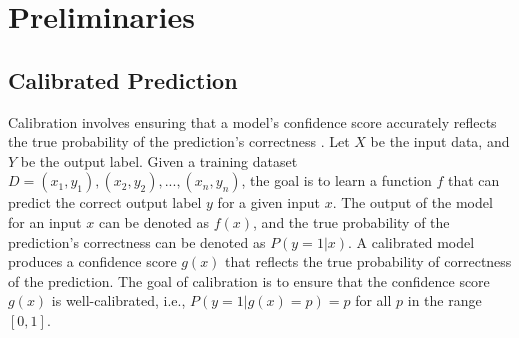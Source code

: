 \section*{Preliminaries}
\label{Sec:Prelem}

\subsection*{Calibrated Prediction}
\label{sec:Calibration}
Calibration involves ensuring that a model's confidence score accurately reflects the true probability of the prediction's correctness \cite{ovadia2019can}. Let $X$ be the input data, and $Y$ be the output label. Given a training dataset $D = {(x_1, y_1), (x_2, y_2),..., (x_n, y_n)}$, the goal is to learn a function $f$ that can predict the correct output label $y$ for a given input $x$. The output of the model for an input $x$ can be denoted as $f(x)$, and the true probability of the prediction's correctness can be denoted as $P(y=1|x)$. A calibrated model produces a confidence score $g(x)$ that reflects the true probability of correctness of the prediction. The goal of calibration is to ensure that the confidence score $g(x)$ is well-calibrated, i.e., $P(y=1|g(x)=p) = p$ for all $p$ in the range $[0, 1]$.

